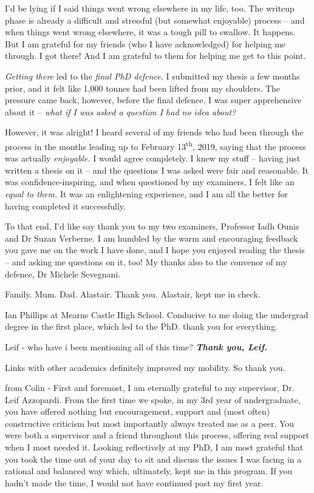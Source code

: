 \begin{preamble}
I'd be lying if I said things went wrong elsewhere in my life, too. The writeup phase is already a difficult and stressful (but somewhat enjoyable) process -- and when things went wrong elsewhere, it was a tough pill to swallow. It happens. But I am grateful for my friends (who I have acknowledged) for helping me through. I got there! And I am grateful to them for helping me get to this point.

 \emph{Getting there} led to the \emph{final PhD defence.} I submitted my thesis a few months prior, and it felt like 1,000 tonnes had been lifted from my shoulders. The pressure came back, however, before the final defence. I was super apprehensive about it -- \emph{what if I was asked a question I had no idea about?}

However, it was alright! I heard several of my friends who had been through the process in the months leading up to February 13\textsuperscript{th}, 2019, saying that the process was actually \emph{enjoyable.} I would agree completely. I knew my stuff -- having just written a thesis on it -- and the questions I was asked were fair and reasonable. It was confidence-inspiring, and when questioned by my examiners, I felt like an \emph{equal to them.} It was an enlightening experience, and I am all the better for having completed it successfully.

To that end, I'd like say thank you to my two examiners, Professor Iadh Ounis and Dr Suzan Verberne. I am humbled by the warm and encouraging feedback you gave me on the work I have done, and I hope you enjoyed reading the thesis -- and asking me questions on it, too! My thanks also to the convenor of my defence, Dr Michele Sevegnani.

Family. Mum. Dad. Alastair. Thank you. Alastair, kept me in check.

Ian Phillips at Mearns Castle High School. Conducive to me doing the undergrad degree in the first place, which led to the PhD. thank you for everything.

Leif - who have i been mentioning all of this time? \emph{\textbf{Thank you, Leif.}}

Links with other academics definitely improved my mobility. So thank you.

from Colin - First and foremost, I am eternally grateful to my supervisor, Dr. Leif Azzopardi. From the first time we spoke, in my 3rd year of undergraduate, you have offered nothing but encouragement, support and (most often) constructive criticism but most importantly always treated me as a peer. You were both a supervisor and a friend throughout this process, offering real support when I most needed it. Looking reflectively at my PhD, I am most grateful that you took the time out of your day to sit and discuss the issues I was facing in a rational and balanced way which, ultimately, kept me in this program. If you hadn't made the time, I would not have continued past my first year.


\end{preamble}
